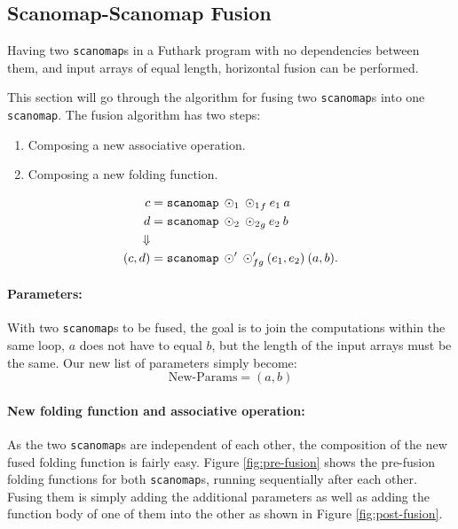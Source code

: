 \documentclass[11pt,bibliography=totocnumbered]{article}
\begin{document}
\newpage
\subsection{Scanomap-Scanomap Fusion}
Having two \texttt{scanomap}s in a Futhark program with no dependencies between them, and input arrays of equal length, horizontal fusion can be performed.

This section will go through the algorithm for fusing two \texttt{scanomap}s into one \texttt{scanomap}. The fusion algorithm has two steps:
\begin{enumerate}
\item Composing a new associative operation.
\item Composing a new folding function.
\end{enumerate}

\begin{align*}
  c &= \mathtt{scanomap} \: \odot_1 \: {\odot_1}_f \: e_1 \: a \\
  d &= \mathtt{scanomap} \: \odot_2 \: {\odot_2}_g \: e_2 \: b \\
\Downarrow \\
  (c,d) &= \mathtt{scanomap} \: \odot' \: \odot'_{fg} \: (e_1, e_2) \: (a, b)\mathnormal{.}
\end{align*}


\paragraph{Parameters:} With two \texttt{scanomap}s to be fused, the goal is to join the computations within the same loop, $a$ does not have to equal $b$, but the length of the input arrays must be the same. Our new list of parameters simply become:
$$\text{New-Params} = (a,b)$$

\paragraph{New folding function and associative operation:} As the two \texttt{scanomap}s are independent of each other, the composition of the new fused folding function is fairly easy. Figure \ref{fig:pre-fusion} shows the pre-fusion folding functions for both \texttt{scanomap}s, running sequentially after each other. Fusing them is simply adding the additional parameters as well as adding the function body of one of them into the other as shown in Figure \ref{fig:post-fusion}. 
\end{document}

